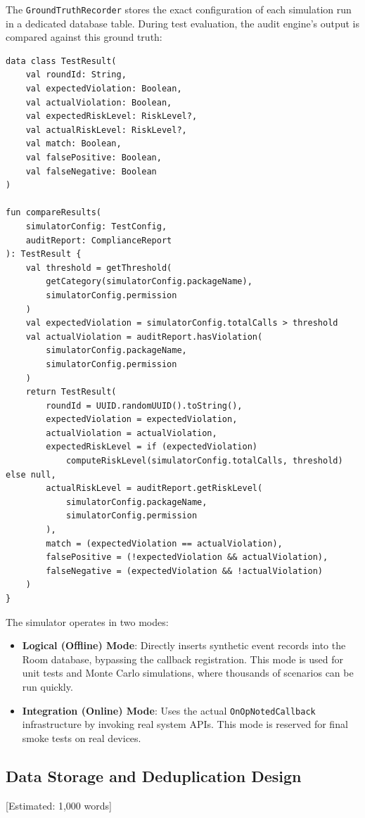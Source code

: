 The \texttt{GroundTruthRecorder} stores the exact configuration of each simulation run in a dedicated database table. During test evaluation, the audit engine's output is compared against this ground truth:

\begin{lstlisting}[caption=Ground truth comparison]
data class TestResult(
    val roundId: String,
    val expectedViolation: Boolean,
    val actualViolation: Boolean,
    val expectedRiskLevel: RiskLevel?,
    val actualRiskLevel: RiskLevel?,
    val match: Boolean,
    val falsePositive: Boolean,
    val falseNegative: Boolean
)

fun compareResults(
    simulatorConfig: TestConfig,
    auditReport: ComplianceReport
): TestResult {
    val threshold = getThreshold(
        getCategory(simulatorConfig.packageName),
        simulatorConfig.permission
    )
    val expectedViolation = simulatorConfig.totalCalls > threshold
    val actualViolation = auditReport.hasViolation(
        simulatorConfig.packageName,
        simulatorConfig.permission
    )
    return TestResult(
        roundId = UUID.randomUUID().toString(),
        expectedViolation = expectedViolation,
        actualViolation = actualViolation,
        expectedRiskLevel = if (expectedViolation) 
            computeRiskLevel(simulatorConfig.totalCalls, threshold) else null,
        actualRiskLevel = auditReport.getRiskLevel(
            simulatorConfig.packageName,
            simulatorConfig.permission
        ),
        match = (expectedViolation == actualViolation),
        falsePositive = (!expectedViolation && actualViolation),
        falseNegative = (expectedViolation && !actualViolation)
    )
}
\end{lstlisting}

The simulator operates in two modes:
\begin{itemize}
\item \textbf{Logical (Offline) Mode}: Directly inserts synthetic event records into the Room database, bypassing the callback registration. This mode is used for unit tests and Monte Carlo simulations, where thousands of scenarios can be run quickly.
\item \textbf{Integration (Online) Mode}: Uses the actual \texttt{OnOpNotedCallback} infrastructure by invoking real system APIs. This mode is reserved for final smoke tests on real devices.
\end{itemize}

\subsection{Data Storage and Deduplication Design} [Estimated: 1,000 words]

